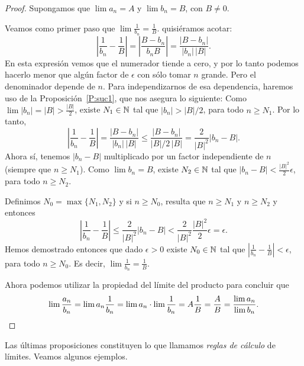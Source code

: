 \begin{proof}
Supongamos que $\lim a_n = A$ y $\lim b_n = B$, con $B \neq 0$.

Veamos como primer paso que $\lim \frac{1}{b_n} = \frac1B$. 
 quisiéramos acotar:
\[
\left| \frac1{b_n} - \frac1B \right| 
= \left| \frac{B-b_n}{b_nB}  \right| 
= \frac{|B - b_n|}{|b_n| \, |B|}.
\]
En esta expresión vemos que el numerador tiende a cero, y por lo tanto podemos hacerlo menor que algún factor de $\epsilon$ con sólo tomar $n$ grande. Pero el denominador depende de $n$. Para independizarnos de esa dependencia, haremos uso de la Proposición~\ref{P:suc1}, que nos asegura lo siguiente:
Como $\lim |b_n| = |B| > \frac{|B|}2$, 
existe $N_1\in\mathbb{N}$ tal que $|b_n| > |B|/2$, para todo $n\ge N_1$. 
Por lo tanto, 
\[
\left| \frac1{b_n} - \frac1B \right| 
= \frac{|B - b_n|}{|b_n| \, |B|}
\le \frac{|B - b_n|}{|B|/2 \, |B|}
= \frac{2}{|B|^2} |b_n - B|.
\]
Ahora sí, tenemos $|b_n - B|$ multiplicado por un factor independiente de $n$ (siempre que $n\ge N_1$).
Como $\lim b_n=B$, existe $N_2\in\mathbb{N}$ tal que $|b_n-B| < \frac{|B|^2}{2} \epsilon$, para todo $n\ge N_2$.

Definimos $N_0 = \max\{N_1,N_2\}$ y si $n \ge N_0$, resulta que $n\ge N_1$ y $n\ge N_2$ y entonces
\[
\left| \frac1{b_n} - \frac1B \right| 
\le \frac{2}{|B|^2} |b_n - B|
< \frac{2}{|B|^2}  \frac{|B|^2}{2} \epsilon = \epsilon.
\]
Hemos demostrado entonces que dado $\epsilon > 0$ existe $N_0\in\mathbb{N}$ tal que $|\frac1{b_n} - \frac1B| < \epsilon$, para todo $n \ge N_0$. Es decir, $\lim \frac{1}{b_n} = \frac1B$.

Ahora podemos utilizar la propiedad del límite del producto para concluir que
\[
\lim \frac{a_n}{b_n} = \lim a_n \frac{1}{b_n} = \lim a_n \cdot \lim \frac{1}{b_n} 
= A \frac1B = \frac AB = \frac{\lim a_n}{\lim b_n}.
\qedhere 
\]
\end{proof}

Las últimas proposiciones constituyen lo que llamamos \emph{reglas de cálculo} de límites.
Veamos algunos ejemplos.

